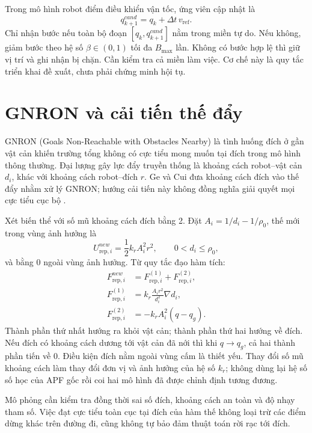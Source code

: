 \documentclass[12pt,a4paper,oneside]{report}
\numberwithin{equation}{chapter}
\newcommand{\rep}{\mathrm{rep}}
\begin{document}
Trong mô hình robot điểm điều khiển vận tốc, ứng viên cập nhật là
\begin{equation}
q_{k+1}^{cand}=q_k+\Delta t\,v_{\mathrm{ref}}.
\label{eq:euler}
\end{equation}
Chỉ nhận bước nếu toàn bộ đoạn $[q_k,q_{k+1}^{cand}]$ nằm trong miền tự do. Nếu không, giảm bước theo hệ số $\beta\in(0,1)$ tối đa $B_{\max}$ lần. Không có bước hợp lệ thì giữ vị trí và ghi nhận bị chặn. Cần kiểm tra cả miền làm việc. Cơ chế này là quy tắc triển khai đề xuất, chưa phải chứng minh hội tụ.

\section{GNRON và cải tiến thế đẩy}

GNRON (Goals Non-Reachable with Obstacles Nearby) là tình huống đích ở gần vật cản khiến trường tổng không có cực tiểu mong muốn tại đích trong mô hình thông thường. Đại lượng gây lực đẩy truyền thống là khoảng cách robot--vật cản $d_i$, khác với khoảng cách robot--đích $r$. Ge và Cui đưa khoảng cách đích vào thế đẩy nhằm xử lý GNRON; hướng cải tiến này không đồng nghĩa giải quyết mọi cực tiểu cục bộ \cite{gecui}.

Xét biến thể với số mũ khoảng cách đích bằng 2. Đặt $A_i=1/d_i-1/\rho_0$, thế mới trong vùng ảnh hưởng là
\begin{equation}
U_{\rep,i}^{new}=\frac12 k_r A_i^2r^2,\qquad 0<d_i\le\rho_0,
\end{equation}
và bằng 0 ngoài vùng ảnh hưởng. Từ quy tắc đạo hàm tích:
\begin{align}
F_{\rep,i}^{new}&=F_{\rep,i}^{(1)}+F_{\rep,i}^{(2)},\\
F_{\rep,i}^{(1)}&=k_r\frac{A_i r^2}{d_i^2}\nabla d_i,\\
F_{\rep,i}^{(2)}&=-k_r A_i^2(q-q_g).
\label{eq:gnron}
\end{align}
Thành phần thứ nhất hướng ra khỏi vật cản; thành phần thứ hai hướng về đích. Nếu đích có khoảng cách dương tới vật cản đã nới thì khi $q\to q_g$, cả hai thành phần tiến về 0. Điều kiện đích nằm ngoài vùng cấm là thiết yếu. Thay đổi số mũ khoảng cách làm thay đổi đơn vị và ảnh hưởng của hệ số $k_r$; không dùng lại hệ số số học của APF gốc rồi coi hai mô hình đã được chỉnh định tương đương.

Mô phỏng cần kiểm tra đồng thời sai số đích, khoảng cách an toàn và độ nhạy tham số. Việc đạt cực tiểu toàn cục tại đích của hàm thế không loại trừ các điểm dừng khác trên đường đi, cũng không tự bảo đảm thuật toán rời rạc tới đích.
\end{document}
